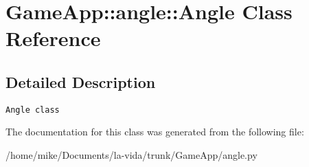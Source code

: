 \hypertarget{classGameApp_1_1angle_1_1Angle}{
\section{GameApp::angle::Angle Class Reference}
\label{classGameApp_1_1angle_1_1Angle}
}


\subsection{Detailed Description}


\footnotesize\begin{verbatim}Angle class\end{verbatim}
\normalsize
 

The documentation for this class was generated from the following file:\begin{CompactItemize}
\item 
/home/mike/Documents/la-vida/trunk/GameApp/angle.py\end{CompactItemize}
